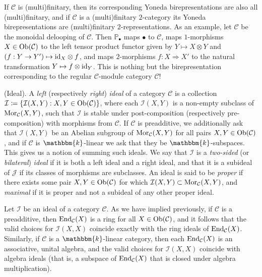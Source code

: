 \noindent If $\mathscr{C}$ is (multi)finitary, then its corresponding Yoneda birepresentations are also all (multi)finitary, and if $\mathscr{C}$ is a (multi)finitary $2$-category its Yoneda birepresentations are (multi)finitary $2$-representations. As an example, let $\mathscr{C}$ be the monoidal delooping of $\mathcal{C}$. Then $\mathbb{P}_\bullet$ maps $\bullet$ to $\mathcal{C}$, maps $1$-morphisms $X \in \textup{Ob}(\mathcal{C})$ to the left tensor product functor given by $Y \mapsto X \otimes Y$ and $(f : Y \to Y') \mapsto \textup{id}_X \otimes f$, and maps $2$-morphisms $f : X \Rightarrow X'$ to the natural transformation $Y \mapsto f \otimes \textup{id}_Y$. This is nothing but the birepresentation corresponding to the regular $\mathcal{C}$-module category $\mathcal{C}$! %
\newpage

\noindent\begin{definition}\textup{(Ideal).} A {\em left} (respectively {\em right}) {\em ideal} of a category $\mathcal{C}$ is a collection\linebreak $\mathcal{I} \coloneqq \{\mathcal{I}(X, Y) : X, Y \in \textup{Ob}(\mathcal{C})\}$, where each $\mathcal{I}(X, Y)$ is a non-empty subclass of $\textup{Mor}_\mathcal{C}(X, Y)$, such that $\mathcal{I}$ is stable under post-composition (respectively pre-composition) with morphisms from $\mathcal{C}$. If $\mathcal{C}$ is preadditive, we additionally ask that $\mathcal{I}(X, Y)$ be an Abelian subgroup of $\textup{Mor}_\mathcal{C}(X, Y)$ for all pairs $X, Y \in \textup{Ob}(\mathcal{C})$, and if $\mathcal{C}$ is $\mathbbm{k}$-linear we ask that they be $\mathbbm{k}$-subspaces. This gives us a notion of summing such ideals. We say that $\mathcal{I}$ is a {\em two-sided} (or {\em bilateral}) {\em ideal} if it is both a left ideal and a right ideal, and that it is a subideal of $\mathcal{J}$ if its classes of morphisms are subclasses. An ideal is said to be {\em proper} if there exists some pair $X, Y \in \textup{Ob}(\mathcal{C})$ for which $\mathcal{I}(X, Y) \subset \textup{Mor}_\mathcal{C}(X, Y)$, and {\em maximal} if it is proper and not a subideal of any other proper ideal.\\
\end{definition}

\noindent Let $\mathcal{I}$ be an ideal of a category $\mathcal{C}$. As we have implied previously, if $\mathcal{C}$ is a preadditive, then $\textup{End}_\mathcal{C}(X)$ is a ring for all $X \in \textup{Ob}(\mathcal{C})$, and it follows that the valid choices for $\mathcal{I}(X, X)$ coincide exactly with the ring ideals of $\textup{End}_\mathcal{C}(X)$. Similarly, if $\mathcal{C}$ is a $\mathbbm{k}$-linear category, then each $\textup{End}_\mathcal{C}(X)$ is an associative, unital algebra, and the valid choices for $\mathcal{I}(X, X)$ coincide with algebra ideals (that is, a subspace of $\textup{End}_\mathcal{C}(X)$ that is closed under algebra multiplication).\\


